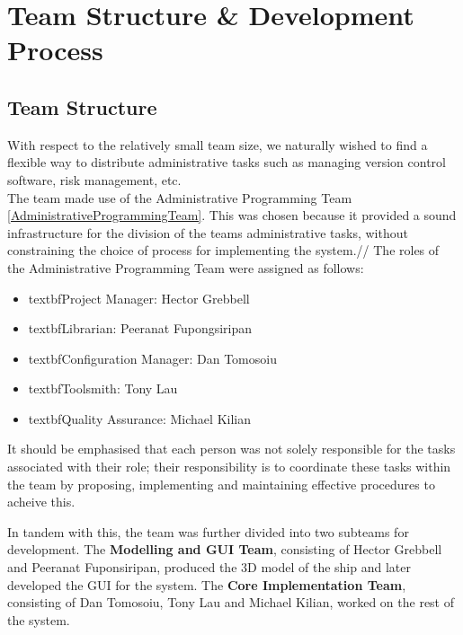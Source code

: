 \documentclass{article}
\begin{document}
\section{Team Structure \& Development Process}
\subsection{Team Structure}
With respect to the relatively small team size, we naturally wished to find a flexible way to distribute administrative tasks such as managing version control software, risk management, etc.\\
The team made use of the Administrative Programming Team \ref{AdministrativeProgrammingTeam}. This was chosen because it provided a sound infrastructure for the division of the teams administrative tasks, without constraining the choice of process for implementing the system.//
The roles of the Administrative Programming Team were assigned as follows:
\begin{itemize}
\item{textbf{Project Manager:} Hector Grebbell}
\item{textbf{Librarian:} Peeranat Fupongsiripan}
\item{textbf{Configuration Manager:} Dan Tomosoiu}
\item{textbf{Toolsmith:} Tony Lau}
\item{textbf{Quality Assurance:} Michael Kilian}
\end{itemize}
It should be emphasised that each person was not solely responsible for the tasks associated with their role; their responsibility is to coordinate these tasks within the team by proposing, implementing and maintaining effective procedures to acheive this.

In tandem with this, the team was further divided into two subteams for development. The \textbf{Modelling and GUI Team}, consisting of Hector Grebbell and Peeranat Fuponsiripan, produced the 3D model of the ship and later developed the GUI for the system. The \textbf{Core Implementation Team}, consisting of Dan Tomosoiu, Tony Lau and Michael Kilian, worked on the rest of the system. 
\end{document}

